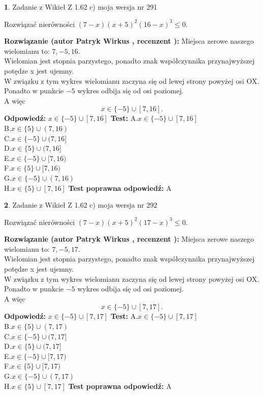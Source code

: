 \documentclass[12pt, a4paper]{article}
\theoremstyle{definition} %
\newtheorem{zad}{}
\newcommand{\zadStart}[1]{\begin{zad}#1\newline}
\newcommand{\zadStop}{\end{zad}}
\newcommand{\rozwStart}[2]{\noindent \textbf{Rozwiązanie (autor #1 , recenzent #2): }\newline}
\newcommand{\rozwStop}{\newline}
\newcommand{\odpStart}{\noindent \textbf{Odpowiedź:}\newline}
\newcommand{\odpStop}{\newline}
\newcommand{\testStart}{\noindent \textbf{Test:}\newline}
\newcommand{\testStop}{\newline}
\newcommand{\kluczStart}{\noindent \textbf{Test poprawna odpowiedź:}\newline}
\newcommand{\kluczStop}{\newline}
\begin{document}
\zadStart{Zadanie z Wikieł Z 1.62 c) moja wersja nr 291}

Rozwiązać nierówności $(7-x)(x+5)^{2}(16-x)^{3}\le0$.
\zadStop
\rozwStart{Patryk Wirkus}{}
Miejsca zerowe naszego wielomianu to: $7, -5, 16$.\\
Wielomian jest stopnia parzystego, ponadto znak współczynnika przy\linebreak najwyższej potędze x jest ujemny.\\ W związku z tym wykres wielomianu zaczyna się od lewej strony powyżej osi OX.\\
Ponadto w punkcie $-5$ wykres odbija się od osi poziomej.\\
A więc $$x \in \{-5\} \cup [7,16].$$
\rozwStop
\odpStart
$x \in \{-5\} \cup [7,16]$
\odpStop
\testStart
A.$x \in \{-5\} \cup [7,16]$\\
B.$x \in \{5\} \cup (7,16)$\\
C.$x \in \{-5\} \cup (7,16]$\\
D.$x \in \{5\} \cup (7,16]$\\
E.$x \in \{-5\} \cup [7,16)$\\
F.$x \in \{5\} \cup [7,16)$\\
G.$x \in \{-5\} \cup (7,16)$\\
H.$x \in \{5\} \cup [7,16]$
\testStop
\kluczStart
A
\kluczStop



\zadStart{Zadanie z Wikieł Z 1.62 c) moja wersja nr 292}

Rozwiązać nierówności $(7-x)(x+5)^{2}(17-x)^{3}\le0$.
\zadStop
\rozwStart{Patryk Wirkus}{}
Miejsca zerowe naszego wielomianu to: $7, -5, 17$.\\
Wielomian jest stopnia parzystego, ponadto znak współczynnika przy\linebreak najwyższej potędze x jest ujemny.\\ W związku z tym wykres wielomianu zaczyna się od lewej strony powyżej osi OX.\\
Ponadto w punkcie $-5$ wykres odbija się od osi poziomej.\\
A więc $$x \in \{-5\} \cup [7,17].$$
\rozwStop
\odpStart
$x \in \{-5\} \cup [7,17]$
\odpStop
\testStart
A.$x \in \{-5\} \cup [7,17]$\\
B.$x \in \{5\} \cup (7,17)$\\
C.$x \in \{-5\} \cup (7,17]$\\
D.$x \in \{5\} \cup (7,17]$\\
E.$x \in \{-5\} \cup [7,17)$\\
F.$x \in \{5\} \cup [7,17)$\\
G.$x \in \{-5\} \cup (7,17)$\\
H.$x \in \{5\} \cup [7,17]$
\testStop
\kluczStart
A
\kluczStop
\end{document}
